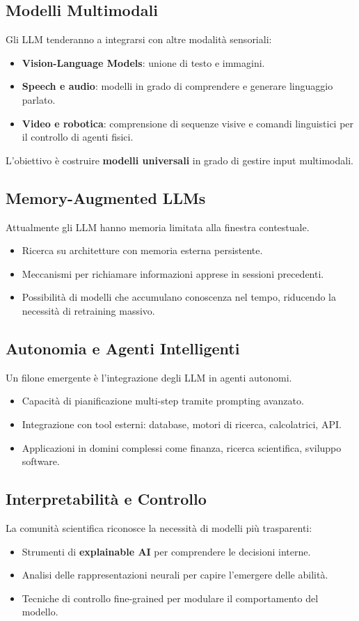 \subsection{Modelli Multimodali}
Gli LLM tenderanno a integrarsi con altre modalità sensoriali:
\begin{itemize}
    \item \textbf{Vision-Language Models}: unione di testo e immagini.
    \item \textbf{Speech e audio}: modelli in grado di comprendere e generare linguaggio parlato.
    \item \textbf{Video e robotica}: comprensione di sequenze visive e comandi linguistici per il controllo di agenti fisici.
\end{itemize}
L'obiettivo è costruire \textbf{modelli universali} in grado di gestire input multimodali.

\subsection{Memory-Augmented LLMs}
Attualmente gli LLM hanno memoria limitata alla finestra contestuale.
\begin{itemize}
    \item Ricerca su architetture con memoria esterna persistente.
    \item Meccanismi per richiamare informazioni apprese in sessioni precedenti.
    \item Possibilità di modelli che accumulano conoscenza nel tempo, riducendo la necessità di retraining massivo.
\end{itemize}

\subsection{Autonomia e Agenti Intelligenti}
Un filone emergente è l'integrazione degli LLM in agenti autonomi.
\begin{itemize}
    \item Capacità di pianificazione multi-step tramite prompting avanzato.
    \item Integrazione con tool esterni: database, motori di ricerca, calcolatrici, API.
    \item Applicazioni in domini complessi come finanza, ricerca scientifica, sviluppo software.
\end{itemize}

\subsection{Interpretabilità e Controllo}
La comunità scientifica riconosce la necessità di modelli più trasparenti:
\begin{itemize}
    \item Strumenti di \textbf{explainable AI} per comprendere le decisioni interne.
    \item Analisi delle rappresentazioni neurali per capire l'emergere delle abilità.
    \item Tecniche di controllo fine-grained per modulare il comportamento del modello.
\end{itemize}

